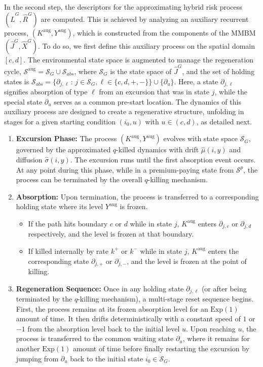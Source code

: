 \documentclass[11pt]{article}
\numberwithin{table}{section}
\numberwithin{figure}{section}
\numberwithin{equation}{section}
\newcommand{\1}{{\mathbf 1}}
\newcommand{\0}{\mat{0}}
\begin{document}
In the second step, the descriptors for the { approximating hybrid risk process $(\hat{L}^G, \hat{R}^G)$ are computed. This is achieved} by analyzing an auxiliary recurrent process, $({ K^{\text{aug}}}, Y^{\text{aug}})$, { which is constructed from the components of the MMBM $(\hat{J}^G, \hat{X}^G)$}. To do so, we first define this auxiliary process on the spatial domain $[c,d]$. The environmental state space is augmented to manage the regeneration cycle, $\mathcal{S}^{\text{aug}} = { \mathcal{S}}_G \cup \mathcal{S}_{abs}$, where ${ \mathcal{S}}_G$ is the { state space of $\hat{J}^G$}, and the set of holding states is $\mathcal{S}_{abs} = \{\partial_{j, \ell} \,:\, j \in { \mathcal{S}}_G, \ell \in \{c,d,+,-\}\} \cup \{\partial_u\}$. Here, a state $\partial_{j, \ell}$ signifies absorption of type $\ell$ from an excursion that was in state $j$, while the special state $\partial_u$ serves as a common pre-start location. The dynamics of this auxiliary process are designed to create a regenerative structure, unfolding in stages for a given starting condition $(i_0, u)$ with $u \in (c,d)$, as detailed next.
\begin{enumerate}
    \item \textbf{Excursion Phase:} The process $({ K^{\text{aug}}}, Y^{\text{aug}})$ evolves with state space ${ \mathcal{S}}_G$, governed by the approximated $q$-killed dynamics with drift $\hat{\mu}(i,y)$ and diffusion $\hat{\sigma}(i,y)$. The excursion runs until the first absorption event occurs. At any point during this phase, while in a premium-paying state from $\mathcal{S}^p$, the process can be terminated by the overall $q$-killing mechanism.

    \item \textbf{Absorption:} Upon termination, the process is transferred to a corresponding holding state where its level $Y^{\text{aug}}$ is frozen.
    \begin{itemize}
        \item If the path hits boundary $c$ or $d$ while in state $j$, ${ K^{\text{aug}}}$ enters $\partial_{j,c}$ or $\partial_{j,d}$ respectively, and the level is frozen at that boundary.
        \item If killed internally by rate $k^+$ or $k^-$ while in state $j$, ${ K^{\text{aug}}}$ enters the corresponding state $\partial_{j,+}$ or $\partial_{j,-}$, and the level is frozen at the point of killing.
    \end{itemize}

    \item \textbf{Regeneration Sequence:} Once in any holding state $\partial_{j, \ell}$ (or after being terminated by the $q$-killing mechanism), a multi-stage reset sequence begins. First, the process remains at its frozen absorption level for an $\mbox{Exp}(1)$ amount of time. It then drifts deterministically with a constant speed of $1$ or $-1$ from the absorption level back to the initial level $u$. Upon reaching $u$, the process is transferred to the common waiting state $\partial_u$, where it remains for another $\mbox{Exp}(1)$ amount of time before finally restarting the excursion by jumping from $\partial_u$ back to the initial state $i_0 \in { \mathcal{S}}_G$.
\end{enumerate}
\end{document}
